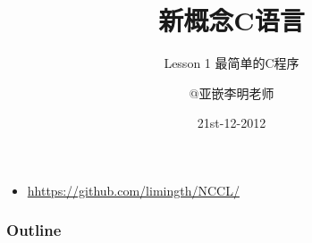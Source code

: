 \documentclass[t]{beamer}
\title{新概念C语言}
\subtitle{Lesson 1 最简单的C程序}
\author{@亚嵌李明老师}
\institute{limingth@gmail.com}
\date{21st-12-2012}
\begin{document}
\begin{frame}
\titlepage
\begin{itemize}
\item 	\url{hhttps://github.com/limingth/NCCL/}
\end{itemize}
\end{frame}

\begin{frame}
\frametitle{Outline}
\tableofcontents[currentsection]
\end{frame}



\end{document}
